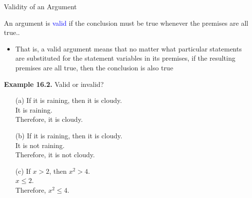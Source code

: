 \documentclass[aspectratio=169]{beamer}
\providecommand{\Blue}[1]{\textcolor{blue}{#1}}
\begin{document}

\begin{frame}[plain]{Validity of an Argument}

 An argument is \Blue{valid} if the conclusion must be true whenever the premises are all true..
   \begin{itemize}
      \item That is, a valid argument means that no matter what particular
statements are substituted for the statement variables in its
premises, if the resulting premises are all true, then the conclusion is also true
   \end{itemize}
 
{\bf Example 16.2.} Valid or invalid? 
  \begin{itemize}
    \item[(a)] If it is raining, then it is cloudy.\\
              It is raining.\\
              Therefore, it is cloudy. %
    \item[(b)] If it is raining, then it is cloudy.\\
              It is not raining.\\
              Therefore, it is not cloudy. %
    \item[(c)] If $x>2$, then $x^2>4$.\\
              $x\leq 2$.\\
              Therefore,  $x^2\leq 4$. %
  \end{itemize}
   
 \end{frame}
 
\end{document}
